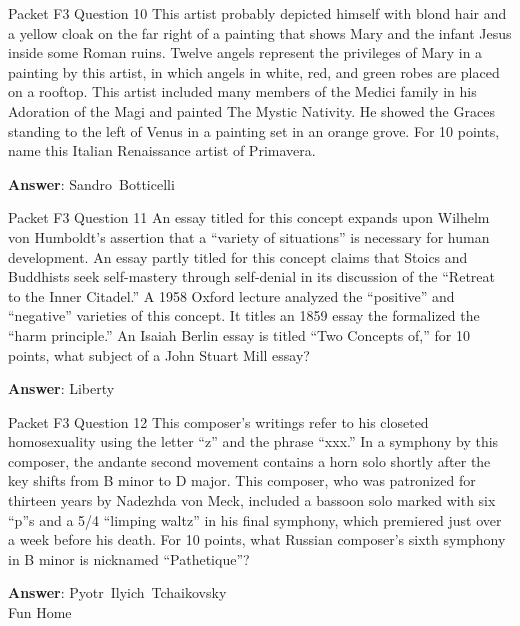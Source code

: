 \begin{frame}{Packet F3 Question 10}
This artist probably depicted himself with blond hair and a yellow cloak on the far right of a painting that shows Mary and the infant Jesus inside some Roman ruins. Twelve angels represent the privileges of Mary in a painting by this artist, in which angels in white, red, and green robes are placed on a rooftop. This artist included many members of the Medici family in his Adoration of the Magi and   painted The Mystic Nativity. He showed     the Graces standing to the left of Venus in a painting set in an orange grove. For   10 points, name this Italian Renaissance artist of Primavera.

\textbf{Answer}: Sandro\ Botticelli\\
\end{frame}

\begin{frame}{Packet F3 Question 11}
An essay titled for this concept expands upon Wilhelm von Humboldt’s assertion that a “variety of situations” is necessary for human development. An essay partly titled for this concept claims that Stoics and Buddhists seek self-mastery through     self-denial in its discussion of the “Retreat to the Inner Citadel.” A 1958 Oxford lecture analyzed the “positive” and “negative” varieties of this concept. It titles an 1859 essay the formalized the “harm principle.”     An Isaiah Berlin essay is titled “Two Concepts of,” for 10 points, what subject of a John Stuart Mill essay?

\textbf{Answer}: Liberty\\
\end{frame}

\begin{frame}{Packet F3 Question 12}
This composer’s writings refer to his closeted homosexuality using   the letter “z” and the phrase “xxx.” In a symphony by this composer, the andante second movement contains a horn solo shortly after the key shifts from B minor to D major. This composer, who was patronized for thirteen years by Nadezhda von Meck, included a bassoon solo marked   with six “p”s and a 5/4 “limping waltz” in his final symphony,     which premiered just over a week before   his death. For 10 points, what Russian composer’s sixth symphony in B minor is nicknamed “Pathetique”?

\textbf{Answer}: Pyotr\ Ilyich\ Tchaikovsky\\
 Fun Home
\end{frame}

